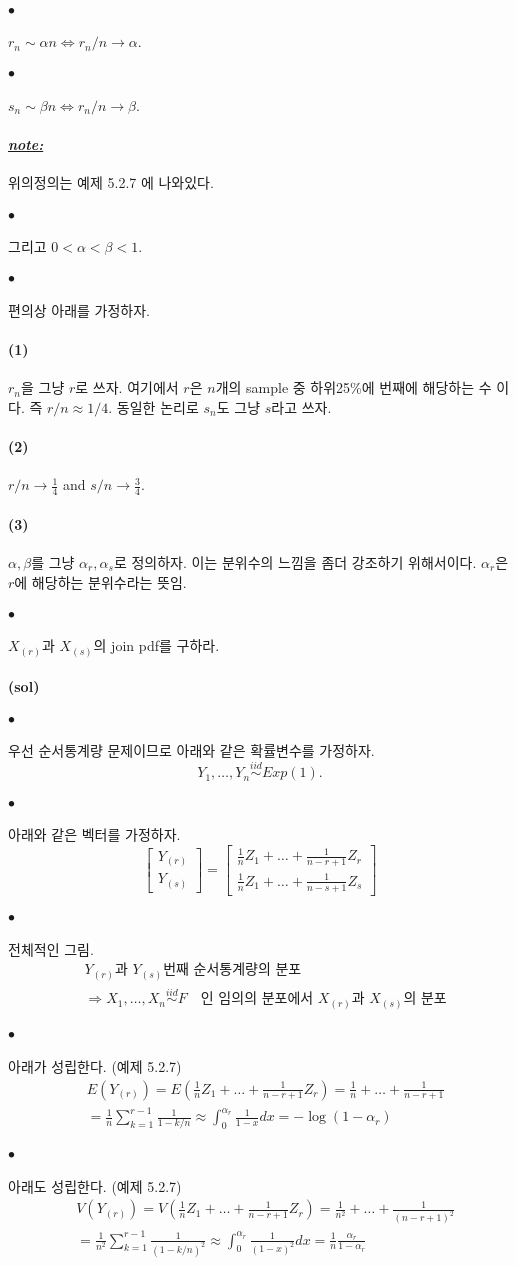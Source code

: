 \documentclass[12pt,oneside,english]{book}
\def\ck{\paragraph{\Large$\bullet$}\Large}
\def\sol{\paragraph{\Large(sol)}\Large}
\def\note{\paragraph{\Large\textit{\underline{note:}}}\Large}
\def\one{\paragraph{\Large(1)}\Large}
\def\two{\paragraph{\Large(2)}\Large}
\def\three{\paragraph{\Large(3)}\Large}
\begin{document}
\ck $r_n \sim \alpha n \Longleftrightarrow r_n/n \to \alpha$. 
\ck $s_n \sim \beta n \Longleftrightarrow r_n/n \to \beta$. 
\note 위의정의는 예제 5.2.7 에 나와있다. 
\ck 그리고 $0<\alpha<\beta<1$. 
\ck 편의상 아래를 가정하자. 
\one $r_n$을 그냥 $r$로 쓰자. 여기에서 $r$은 $n$개의 sample 중 하위25\%에 번째에 해당하는 수 이다. 즉 $r/n \approx 1/4$. 동일한 논리로 $s_n$도 그냥 $s$라고 쓰자. 
\two $r/n \to \frac{1}{4}$ and $s/n \to \frac{3}{4}$. 
\three $\alpha,\beta$를 그냥 $\alpha_r,\alpha_s$로 정의하자. 이는 분위수의 느낌을 좀더 강조하기 위해서이다. $\alpha_r$은 $r$에 해당하는 분위수라는 뜻임. 

\ck $X_{(r)}$과 $X_{(s)}$의 join pdf를 구하라. 

\sol 

\ck 우선 순서통계량 문제이므로 아래와 같은 확률변수를 가정하자. 
\[
Y_1,\dots,Y_n \overset{iid}{\sim} Exp(1).
\]
\ck 아래와 같은 벡터를 가정하자. 
\[
\begin{bmatrix}Y_{(r)} \\ Y_{(s)}\end{bmatrix}=\begin{bmatrix} \frac{1}{n}Z_1+\dots+\frac{1}{n-r+1}Z_r \\  \frac{1}{n}Z_1+\dots+\frac{1}{n-s+1}Z_s \end{bmatrix}
\]

\ck 전체적인 그림.
\begin{align*}
& \mbox{$Y_{(r)}$과 $Y_{(s)}$번째 순서통계량의 분포} \\ 
& \Longrightarrow X_1,\dots,X_n \overset{iid}{\sim} F \quad \mbox{인 임의의 분포에서 $X_{(r)}$과 $X_{(s)}$의 분포}
\end{align*}


\ck 아래가 성립한다. (예제 5.2.7)
\begin{align*}
& E(Y_{(r)})=E\left(\frac{1}{n}Z_1+\dots+\frac{1}{n-r+1}Z_r\right)=
\frac{1}{n}+\dots+\frac{1}{n-r+1} \\ 
& =\frac{1}{n} \sum_{k=1}^{r-1}\frac{1}{1-k/n} \approx \int_0^{\alpha_r}\frac{1}{1-x}dx=-\log(1-\alpha_r)
\end{align*}

\ck 아래도 성립한다. (예제 5.2.7)
\begin{align*}
&V(Y_{(r)})= V\left(\frac{1}{n}Z_1+\dots+\frac{1}{n-r+1}Z_r\right)=
\frac{1}{n^2}+\dots+\frac{1}{(n-r+1)^2} \\ 
& =\frac{1}{n^2} \sum_{k=1}^{r-1}\frac{1}{(1-k/n)^2} \approx \int_0^{\alpha_r}\frac{1}{(1-x)^2}dx=\frac{1}{n}\frac{\alpha_r}{1-\alpha_r}
\end{align*}
\end{document}
